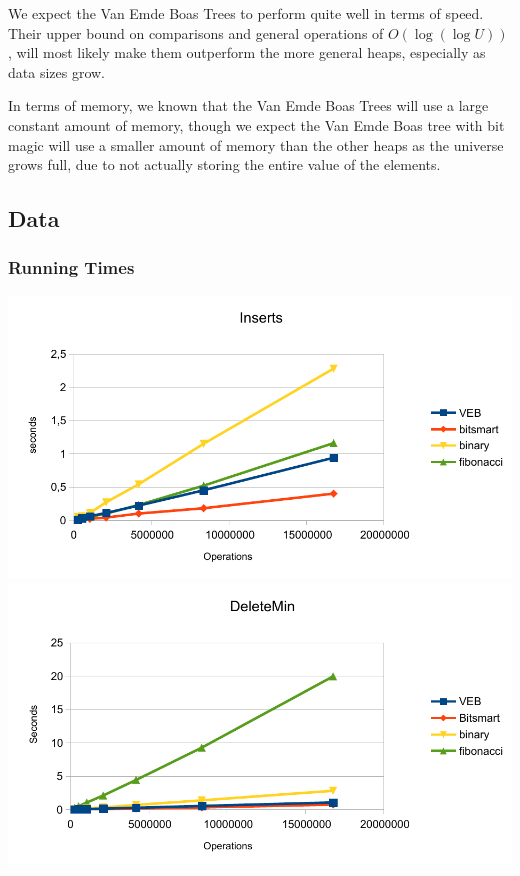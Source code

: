 We expect the Van Emde Boas Trees to perform quite well in terms of speed. Their upper bound on comparisons and general operations of $O(\log (\log U))$, will most likely  make them outperform the more general heaps, especially as data sizes grow.

In terms of memory, we known that the Van Emde Boas Trees will use a large constant amount of memory, though we expect the Van Emde Boas tree with bit magic will use a smaller amount of memory than the other heaps as the universe grows full, due to not actually storing the entire value of the elements.

\subsection{Data}

\subsubsection{Running Times}
\includegraphics[width=\textwidth]{graphs/Inserts.pdf}
\includegraphics[width=\textwidth]{graphs/DeleteMin.pdf}
